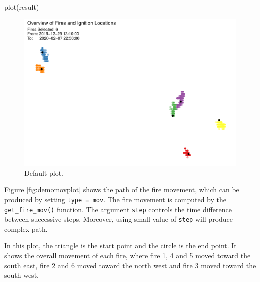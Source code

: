 \begin{Schunk}
\begin{Sinput}
plot(result)
\end{Sinput}
\begin{figure}

{\centering \includegraphics[width=0.8\linewidth]{clustering_paper_files/figure-latex/demodefplot-1} 

}

\caption[Default plot]{Default plot.}\label{fig:demodefplot}
\end{figure}
\end{Schunk}

Figure \ref{fig:demomovplot} shows the path of the fire movement, which
can be produced by setting
\texttt{type\ =\ \textquotesingle{}mov\textquotesingle{}}. The fire
movement is computed by the \texttt{get\_fire\_mov()} function. The
argument \texttt{step} controls the time difference between successive
steps. Moreover, using small value of \texttt{step} will produce complex
path.

In this plot, the triangle is the start point and the circle is the end
point. It shows the overall movement of each fire, where fire 1, 4 and 5
moved toward the south east, fire 2 and 6 moved toward the north west
and fire 3 moved toward the south west.

